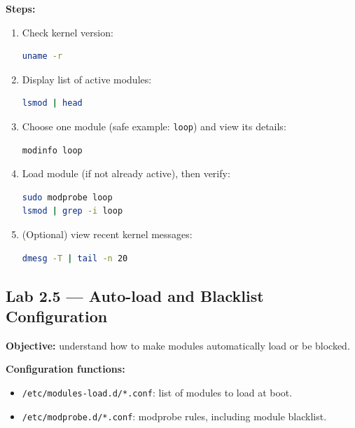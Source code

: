 \textbf{Steps:}
\begin{enumerate}
    \item Check kernel version:
\begin{lstlisting}[language=bash, caption={Check kernel version}]
uname -r
\end{lstlisting}

    \item Display list of active modules:
\begin{lstlisting}[language=bash, caption={List of active modules}]
lsmod | head
\end{lstlisting}

    \item Choose one module (safe example: \texttt{loop}) and view its details:
\begin{lstlisting}[language=bash, caption={Module details with modinfo}]
modinfo loop
\end{lstlisting}

    \item Load module (if not already active), then verify:
\begin{lstlisting}[language=bash, caption={Load module and verify}]
sudo modprobe loop
lsmod | grep -i loop
\end{lstlisting}

    \item (Optional) view recent kernel messages:
\begin{lstlisting}[language=bash, caption={Check recent kernel log}]
dmesg -T | tail -n 20
\end{lstlisting}
\end{enumerate}

\subsection*{Lab 2.5 --- Auto-load and Blacklist Configuration}
\textbf{Objective:} understand how to make modules automatically load or be blocked.

\textbf{Configuration functions:}
\begin{itemize}
    \item \texttt{/etc/modules-load.d/*.conf}: list of modules to load at boot.
    \item \texttt{/etc/modprobe.d/*.conf}: modprobe rules, including module blacklist.
\end{itemize}

